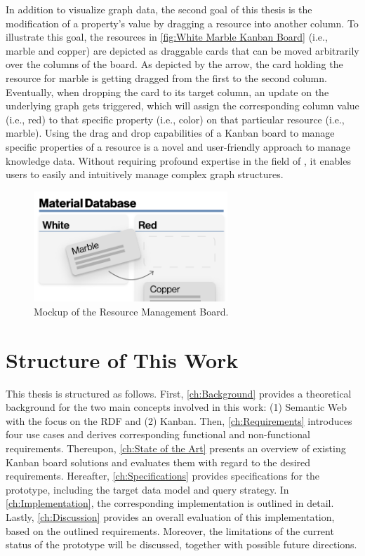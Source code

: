 In addition to visualize graph data, the second goal of this thesis is the modification of a property’s value by dragging a resource into another column. To illustrate this goal, the resources in \autoref{fig:White Marble Kanban Board} (i.e., marble and copper) are depicted as draggable cards that can be moved arbitrarily over the columns of the board. As depicted by the arrow, the card holding the resource for marble is getting dragged from the first to the second column. Eventually, when dropping the card to its target column, an update on the underlying graph gets triggered, which will assign the corresponding column value (i.e., red) to that specific property (i.e., color) on that particular resource (i.e., marble). Using the drag and drop capabilities of a Kanban board to manage specific properties of a resource is a novel and user-friendly approach to manage knowledge data. Without requiring profound expertise in the field of , it enables users to easily and intuitively manage complex graph structures.

\begin{figure}[ht]
    \libertineLF
    \centering
    \includegraphics[width=73mm]{img/12-RMB-Mockup.pdf}
    \caption[Mockup of the Resource Management Board]{Mockup of the Resource Management Board.}
    \label{fig:White Marble Kanban Board}
    \libertineOsF
\end{figure}



\section{Structure of This Work}
\label{sec:structure}

This thesis is structured as follows. First, \autoref{ch:Background} provides a theoretical background for the two main concepts involved in this work: (1) Semantic Web with the focus on the \acrshort*{RDF} and (2) Kanban. Then, \autoref{ch:Requirements} introduces four use cases and derives corresponding functional and non-functional requirements. Thereupon, \autoref{ch:State of the Art} presents an overview of existing  Kanban board solutions and evaluates them with regard to the desired requirements. Hereafter, \autoref{ch:Specifications} provides specifications for the prototype, including the target data model and query strategy. In \autoref{ch:Implementation}, the corresponding implementation is outlined in detail. Lastly, \autoref{ch:Discussion} provides an overall evaluation of this implementation, based on the outlined requirements. Moreover, the limitations of the current status of the prototype will be discussed, together with possible future directions. 
